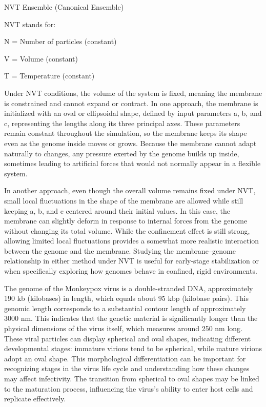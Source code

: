 \documentclass[12pt]{article}
\begin{document}
\begin{flushleft}
\noindent NVT Ensemble (Canonical Ensemble)

NVT stands for:

    N = Number of particles (constant)

    V = Volume (constant)

    T = Temperature (constant)

Under NVT conditions, the volume of the system is fixed, meaning the membrane is constrained and cannot expand or contract. In one approach, the membrane is initialized with an oval or ellipsoidal shape, defined by input parameters a, b, and c, representing the lengths along its three principal axes. These parameters remain constant throughout the simulation, so the membrane keeps its shape even as the genome inside moves or grows. Because the membrane cannot adapt naturally to changes, any pressure exerted by the genome builds up inside, sometimes leading to artificial forces that would not normally appear in a flexible system.

In another approach, even though the overall volume remains fixed under NVT, small local fluctuations in the shape of the membrane are allowed while still keeping a, b, and c centered around their initial values. In this case, the membrane can slightly deform in response to internal forces from the genome without changing its total volume. While the confinement effect is still strong, allowing limited local fluctuations provides a somewhat more realistic interaction between the genome and the membrane. Studying the membrane–genome relationship in either method under NVT is useful for early-stage stabilization or when specifically exploring how genomes behave in confined, rigid environments.



The genome of the Monkeypox virus is a double-stranded DNA, approximately 190 kb (kilobases) in length, which equals about 95 kbp (kilobase pairs). This genomic length corresponds to a substantial contour length of approximately 3000 nm. This indicates that the genetic material is significantly longer than the physical dimensions of the virus itself, which measures around 250 nm long. 
These viral particles can display spherical and oval shapes, indicating different developmental stages: immature virions tend to be spherical, while mature virions adopt an oval shape. This morphological differentiation can be important for recognizing stages in the virus life cycle and understanding how these changes may affect infectivity. The transition from spherical to oval shapes may be linked to the maturation process, influencing the virus's ability to enter host cells and replicate effectively.\\


\end{flushleft}
\end{document}
